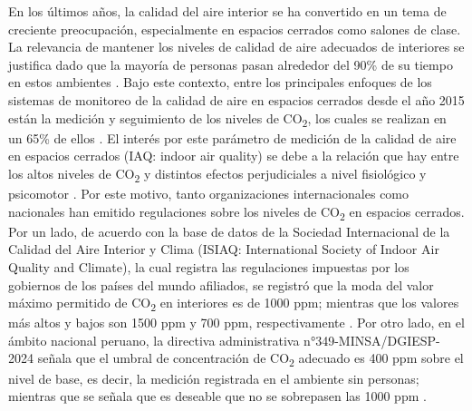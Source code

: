 
En los últimos años, la calidad del aire interior se ha convertido en un tema de creciente preocupación, especialmente en espacios cerrados como salones de clase. La relevancia de mantener los niveles de calidad de aire adecuados de interiores se justifica dado que la mayoría de personas pasan alrededor del 90\% de su  tiempo en estos ambientes \cite{its_about_time_a_comparison_of_canadian_and_american_time_activity_patterns}. Bajo este contexto, entre los principales enfoques de los sistemas de monitoreo de la calidad de aire en espacios cerrados desde el año 2015 están la medición y seguimiento de los niveles de CO\textsubscript{2}, los cuales se realizan en un 65\% de ellos \cite{IAQ_monitoring_systems_based_on_internet_of_things_a_systematic_review}. El interés por este parámetro de medición de la calidad de aire en espacios cerrados (IAQ: indoor air quality) se debe a la relación que hay entre los altos niveles de CO\textsubscript{2} y distintos efectos perjudiciales a nivel fisiológico y psicomotor \cite{effects_of_low_level_inhalation_exposure_to_carbon_dioxide_in_indoor_environments_a_short_review_on_human_health_and_psychomotor_performance}. Por este motivo, tanto organizaciones internacionales como nacionales han emitido regulaciones sobre los niveles de CO\textsubscript{2} en espacios cerrados. Por un lado, de acuerdo con la base de datos de la Sociedad Internacional de la Calidad del Aire Interior y Clima (ISIAQ: International Society of Indoor Air Quality and Climate), la cual registra las regulaciones impuestas por los gobiernos de los países del mundo afiliados, se registró que la moda del valor máximo permitido de CO\textsubscript{2} en interiores es de 1000 ppm; mientras que los valores más altos y bajos son 1500 ppm y 700 ppm, respectivamente \cite{indoor_air_quality_guidelines_from_across_the_world_an_appraisal_considering_energy_saving_health_productivity_and_comfort} \cite{ISIAQ_database}. Por otro lado, en el ámbito nacional peruano, la directiva administrativa n°349-MINSA/DGIESP-2024 señala que el umbral de concentración de CO\textsubscript{2} adecuado es 400 ppm sobre el nivel de base, es decir, la medición registrada en el ambiente sin personas; mientras que se señala que es deseable que no se sobrepasen las 1000 ppm \cite{directiva_minsa}. 

